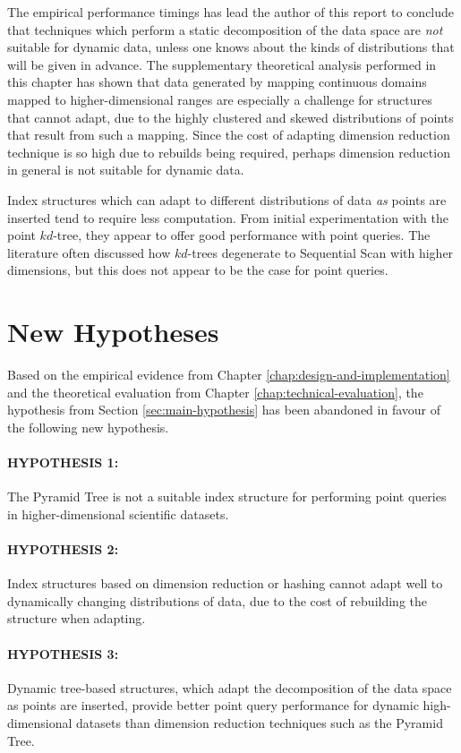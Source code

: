 The empirical performance timings has lead the author of this report to conclude that techniques which perform a static decomposition of the data space are \textit{not} suitable for dynamic data, unless one knows about the kinds of distributions that will be given in advance. The supplementary theoretical analysis performed in this chapter has shown that data generated by mapping continuous domains mapped to higher-dimensional ranges are especially a challenge for structures that cannot adapt, due to the highly clustered and skewed distributions of points that result from such a mapping. Since the cost of adapting dimension reduction technique is so high due to rebuilds being required, perhaps dimension reduction in general is not suitable for dynamic data.

Index structures which can adapt to different distributions of data \textit{as} points are inserted tend to require less computation. From initial experimentation with the point $kd$-tree, they appear to offer good performance with point queries. The literature often discussed how $kd$-trees degenerate to Sequential Scan with higher dimensions, but this does not appear to be the case for point queries.

\section{New Hypotheses}

Based on the empirical evidence from Chapter \ref{chap:design-and-implementation} and the theoretical evaluation from Chapter \ref{chap:technical-evaluation}, the hypothesis from Section \ref{sec:main-hypothesis} has been abandoned in favour of the following new hypothesis.

\paragraph{\textbf{HYPOTHESIS 1:}} The Pyramid Tree is not a suitable index structure for performing point queries in higher-dimensional scientific datasets.

\paragraph{\textbf{HYPOTHESIS 2:}} Index structures based on dimension reduction or hashing cannot adapt well to dynamically changing distributions of data, due to the cost of rebuilding the structure when adapting.

\paragraph{\textbf{HYPOTHESIS 3:}} Dynamic tree-based structures, which adapt the decomposition of the data space as points are inserted, provide better point query performance for dynamic high-dimensional datasets than dimension reduction techniques such as the Pyramid Tree.

